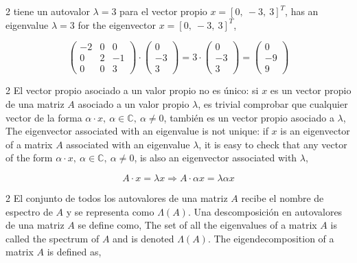 \begin{paracol}{2}
tiene un autovalor $\lambda=3$ para el vector propio $x=[0,\  -3,\  3]^T$,
\switchcolumn
has an eigenvalue $\lambda=3$ for the eigenvector $x=[0,\  -3,\  3]^T$,
\end{paracol}

\begin{equation*}
\begin{pmatrix}
-2& 0& 0\\
0& 2 & -1\\
0& 0& 3
\end{pmatrix}\cdot \begin{pmatrix}
0\\
-3\\
3
\end{pmatrix}=3\cdot \begin{pmatrix}
0\\
-3\\
3
\end{pmatrix}=\begin{pmatrix}
0\\
-9\\
9
\end{pmatrix}
\end{equation*}
\begin{paracol}{2}
El vector propio asociado a un valor propio no es único: si $x$ es un vector propio de una matriz $A$ asociado a un valor propio $\lambda$, es trivial comprobar que cualquier vector de la forma $\alpha\cdot x, \ \alpha \in \mathbb{C}, \ \alpha \neq 0$, también es un vector propio asociado a $\lambda$,
\switchcolumn
The eigenvector associated with an eigenvalue is not unique: if $x$ is an eigenvector of a matrix $A$ associated with an eigenvalue $\lambda$, it is easy to check that any vector of the form $\alpha \cdot x, \ \alpha \in \mathbb{C}, \ \alpha \neq 0$, is also an eigenvector associated with $\lambda$, 
\end{paracol}
\begin{equation*}
A\cdot x= \lambda x \Rightarrow A \cdot \alpha x = \lambda  \alpha x
\end{equation*}
\begin{paracol}{2}
El conjunto de todos los autovalores de una matriz $A$ recibe el nombre de espectro de $A$ y se representa como $\Lambda(A)$.
Una descomposición en autovalores de una matriz $A$ se define como,
\switchcolumn
 The set of all the eigenvalues of a matrix $A$ is called the spectrum of $A$ and is denoted $\Lambda(A)$. The eigendecomposition of a matrix $A$ is defined as,
\end{paracol}
